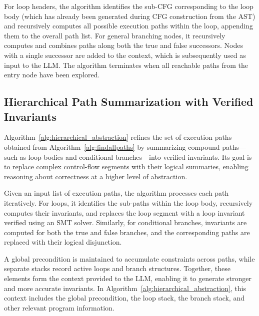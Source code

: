 For loop headers, the algorithm identifies the sub-CFG corresponding to the loop body (which has already been generated during CFG construction from the AST) and recursively computes all possible execution paths within the loop, appending them to the overall path list. For general branching nodes, it recursively computes and combines paths along both the true and false successors. Nodes with a single successor are added to the context, which is subsequently used as input to the LLM. The algorithm terminates when all reachable paths from the entry node have been explored.


\subsection{Hierarchical Path Summarization with Verified Invariants}

Algorithm~\ref{alg:hierarchical_abstraction} refines the set of execution paths obtained from Algorithm~\ref{alg:findallpaths} by summarizing compound paths—such as loop bodies and conditional branches—into verified invariants. Its goal is to replace complex control-flow segments with their logical summaries, enabling reasoning about correctness at a higher level of abstraction.

Given an input list of execution paths, the algorithm processes each path iteratively. For loops, it identifies the sub-paths within the loop body, recursively computes their invariants, and replaces the loop segment with a loop invariant verified using an SMT solver. Similarly, for conditional branches, invariants are computed for both the true and false branches, and the corresponding paths are replaced with their logical disjunction.

A global precondition is maintained to accumulate constraints across paths, while separate stacks record active loops and branch structures. Together, these elements form the context provided to the LLM, enabling it to generate stronger and more accurate invariants. In Algorithm~\ref{alg:hierarchical_abstraction}, this context includes the global precondition, the loop stack, the branch stack, and other relevant program information.





